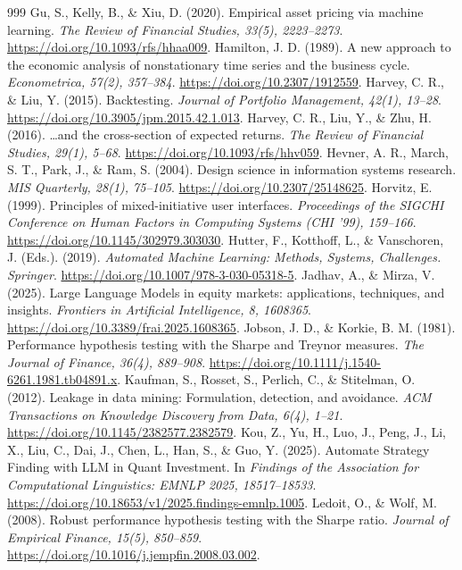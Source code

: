 \documentclass[11pt,a4paper]{article}
\begin{document}
\begin{thebibliography}{999}
 Gu, S., Kelly, B., \& Xiu, D. (2020). Empirical asset pricing via machine learning. \emph{The Review of Financial Studies, 33(5), 2223--2273}. \url{https://doi.org/10.1093/rfs/hhaa009}.
 Hamilton, J. D. (1989). A new approach to the economic analysis of nonstationary time series and the business cycle. \emph{Econometrica, 57(2), 357--384}. \url{https://doi.org/10.2307/1912559}.
 Harvey, C. R., \& Liu, Y. (2015). Backtesting. \emph{Journal of Portfolio Management, 42(1), 13--28}. \url{https://doi.org/10.3905/jpm.2015.42.1.013}.
 Harvey, C. R., Liu, Y., \& Zhu, H. (2016). \ldots and the cross-section of expected returns. \emph{The Review of Financial Studies, 29(1), 5--68}. \url{https://doi.org/10.1093/rfs/hhv059}.
 Hevner, A. R., March, S. T., Park, J., \& Ram, S. (2004). Design science in information systems research. \emph{MIS Quarterly, 28(1), 75--105}. \url{https://doi.org/10.2307/25148625}.
 Horvitz, E. (1999). Principles of mixed-initiative user interfaces. \emph{Proceedings of the SIGCHI Conference on Human Factors in Computing Systems (CHI '99), 159--166}. \url{https://doi.org/10.1145/302979.303030}.
 Hutter, F., Kotthoff, L., \& Vanschoren, J. (Eds.). (2019). \emph{Automated Machine Learning: Methods, Systems, Challenges. Springer}. \url{https://doi.org/10.1007/978-3-030-05318-5}.
 Jadhav, A., \& Mirza, V. (2025). Large Language Models in equity markets: applications, techniques, and insights. \emph{Frontiers in Artificial Intelligence, 8, 1608365}. \url{https://doi.org/10.3389/frai.2025.1608365}.
 Jobson, J. D., \& Korkie, B. M. (1981). Performance hypothesis testing with the Sharpe and Treynor measures. \emph{The Journal of Finance, 36(4), 889--908}. \url{https://doi.org/10.1111/j.1540-6261.1981.tb04891.x}.
 Kaufman, S., Rosset, S., Perlich, C., \& Stitelman, O. (2012). Leakage in data mining: Formulation, detection, and avoidance. \emph{ACM Transactions on Knowledge Discovery from Data, 6(4), 1--21}. \url{https://doi.org/10.1145/2382577.2382579}.
 Kou, Z., Yu, H., Luo, J., Peng, J., Li, X., Liu, C., Dai, J., Chen, L., Han, S., \& Guo, Y. (2025). Automate Strategy Finding with LLM in Quant Investment. In \emph{Findings of the Association for Computational Linguistics: EMNLP 2025, 18517--18533}. \url{https://doi.org/10.18653/v1/2025.findings-emnlp.1005}.
 Ledoit, O., \& Wolf, M. (2008). Robust performance hypothesis testing with the Sharpe ratio. \emph{Journal of Empirical Finance, 15(5), 850--859}. \url{https://doi.org/10.1016/j.jempfin.2008.03.002}.

\end{thebibliography}
\end{document}
